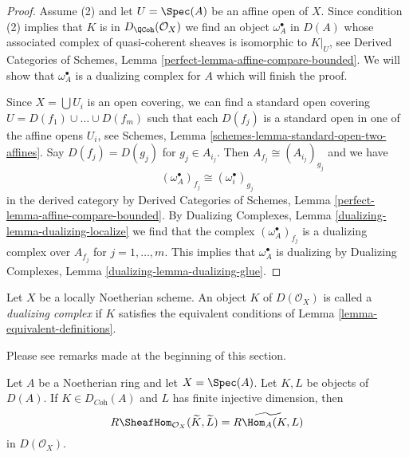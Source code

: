 \begin{proof}
Assume (2) and let $U = \Spec(A)$ be an affine open of $X$.
Since condition (2) implies that $K$ is in $D_\QCoh(\mathcal{O}_X)$
we find an object $\omega_A^\bullet$ in $D(A)$ whose associated
complex of quasi-coherent sheaves is isomorphic to $K|_U$, see
Derived Categories of Schemes, Lemma
\ref{perfect-lemma-affine-compare-bounded}.
We will show that $\omega_A^\bullet$ is a dualizing complex for $A$
which will finish the proof.

\medskip\noindent
Since $X = \bigcup U_i$ is an open covering, we can find a standard
open covering $U = D(f_1) \cup \ldots \cup D(f_m)$ such that
each $D(f_j)$ is a standard open in one of the affine opens $U_i$, see
Schemes, Lemma \ref{schemes-lemma-standard-open-two-affines}.
Say $D(f_j) = D(g_j)$ for $g_j \in A_{i_j}$.
Then $A_{f_j} \cong (A_{i_j})_{g_j}$ and we have
$$
(\omega_A^\bullet)_{f_j} \cong (\omega_i^\bullet)_{g_j}
$$
in the derived category by
Derived Categories of Schemes, Lemma
\ref{perfect-lemma-affine-compare-bounded}.
By Dualizing Complexes, Lemma \ref{dualizing-lemma-dualizing-localize}
we find that
the complex $(\omega_A^\bullet)_{f_j}$ is a dualizing complex over
$A_{f_j}$ for $j = 1, \ldots, m$. This implies that $\omega_A^\bullet$
is dualizing by
Dualizing Complexes, Lemma \ref{dualizing-lemma-dualizing-glue}.
\end{proof}

\begin{definition}
\label{definition-dualizing-scheme}
Let $X$ be a locally Noetherian scheme. An object $K$ of
$D(\mathcal{O}_X)$ is called a {\it dualizing complex} if
$K$ satisfies the equivalent conditions of
Lemma \ref{lemma-equivalent-definitions}.
\end{definition}

\noindent
Please see remarks made at the beginning of this section.

\begin{lemma}
\label{lemma-affine-duality}
Let $A$ be a Noetherian ring and let $X = \Spec(A)$. Let $K, L$ be objects
of $D(A)$. If $K \in D_{\textit{Coh}}(A)$ and $L$ has finite injective
dimension, then
$$
R\SheafHom_{\mathcal{O}_X}(\widetilde{K}, \widetilde{L})
=
\widetilde{R\Hom_A(K, L)}
$$
in $D(\mathcal{O}_X)$.
\end{lemma}

